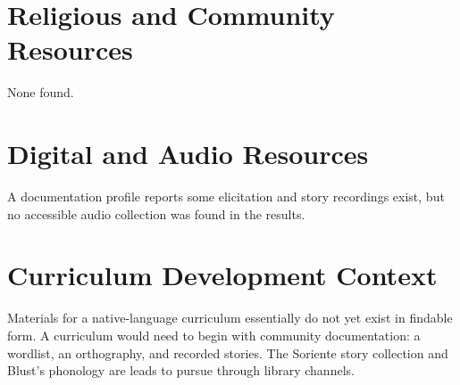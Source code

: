 \documentclass[12pt]{article}
\begin{document}
\section{Religious and Community Resources}
None found.

\section{Digital and Audio Resources}
A documentation profile reports some elicitation and story recordings exist, but no accessible audio collection was found in the results.

\section{Curriculum Development Context}
Materials for a native-language curriculum essentially do not yet exist in findable form. A curriculum would need to begin with community documentation: a wordlist, an orthography, and recorded stories. The Soriente story collection and Blust's phonology are leads to pursue through library channels.
\end{document}
